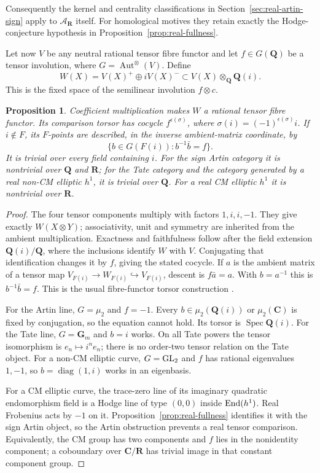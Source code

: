 \documentclass[11pt]{article}
\newtheorem{proposition}[theorem]{Proposition}
\theoremstyle{definition}\newtheorem{definition}[theorem]{Definition}
\theoremstyle{remark}\newtheorem{remark}[theorem]{Remark}
\newcommand{\Q}{\mathbf Q}\newcommand{\Z}{\mathbf Z}
\newcommand{\R}{\mathbf R}\newcommand{\C}{\mathbf C}
\newcommand{\Gm}{\mathbf G_m}\newcommand{\B}{\mathrm B}\newcommand{\dR}{\mathrm{dR}}
\DeclareMathOperator{\Aut}{Aut}\DeclareMathOperator{\Isom}{Isom}
\begin{document}
Consequently the kernel and centrality classifications in Section~\ref{sec:real-artin-sign} apply to $\mathcal A_{\R}$ itself. For homological motives they retain exactly the Hodge-conjecture hypothesis in Proposition~\ref{prop:real-fullness}.

Let now $V$ be any neutral rational tensor fibre functor and let $f\in G(\Q)$ be a tensor involution, where $G=\Aut^\otimes(V)$. Define
\[
                  W(X)=V(X)^+\oplus iV(X)^-
                       \subset V(X)\otimes_{\Q}\Q(i).
\]
This is the fixed space of the semilinear involution $f\otimes c$.

\begin{proposition}\label{prop:betti-twist}
Coefficient multiplication makes $W$ a rational tensor fibre functor. Its comparison torsor has cocycle $f^{\epsilon(\sigma)}$, where $\sigma(i)=(-1)^{\epsilon(\sigma)}i$. If $i\notin F$, its $F$-points are described, in the inverse ambient-matrix coordinate, by
\[
       \{b\in G(F(i)):b^{-1}\bar b=f\}.
\]
It is trivial over every field containing $i$. For the sign Artin category it is nontrivial over $\Q$ and $\R$; for the Tate category and the category generated by a real non-CM elliptic $h^1$, it is trivial over $\Q$. For a real CM elliptic $h^1$ it is nontrivial over $\R$.
\end{proposition}
\begin{proof}
The four tensor components multiply with factors $1,i,i,-1$. They give exactly $W(X\otimes Y)$; associativity, unit and symmetry are inherited from the ambient multiplication. Exactness and faithfulness follow after the field extension $\Q(i)/\Q$, where the inclusions identify $W$ with $V$. Conjugating that identification changes it by $f$, giving the stated cocycle. If $a$ is the ambient matrix of a tensor map $V_{F(i)}\to W_{F(i)}\hookrightarrow V_{F(i)}$, descent is $f\bar a=a$. With $b=a^{-1}$ this is $b^{-1}\bar b=f$. This is the usual fibre-functor torsor construction \cite[Theorem~3.2]{DeligneMilne}.

For the Artin line, $G=\mu_2$ and $f=-1$. Every $b\in\mu_2(\Q(i))$ or $\mu_2(\C)$ is fixed by conjugation, so the equation cannot hold. Its torsor is $\operatorname{Spec}\Q(i)$. For the Tate line, $G=\Gm$ and $b=i$ works. On all Tate powers the tensor isomorphism is $e_n\mapsto i^ne_n$; there is no order-two tensor relation on the Tate object. For a non-CM elliptic curve, $G=\operatorname{GL}_2$ and $f$ has rational eigenvalues $1,-1$, so $b=\operatorname{diag}(1,i)$ works in an eigenbasis.

For a CM elliptic curve, the trace-zero line of its imaginary quadratic endomorphism field is a Hodge line of type $(0,0)$ inside $\operatorname{End}(h^1)$. Real Frobenius acts by $-1$ on it. Proposition~\ref{prop:real-fullness} identifies it with the sign Artin object, so the Artin obstruction prevents a real tensor comparison. Equivalently, the CM group has two components and $f$ lies in the nonidentity component; a coboundary over $\C/\R$ has trivial image in that constant component group.
\end{proof}
\end{document}

